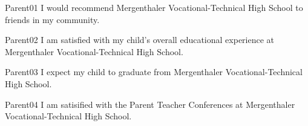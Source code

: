 



\begin{question}{Parent01}
    \QuestionIndicative
    I would recommend Mergenthaler Vocational-Technical High School
        to friends in my community.
    \begin{choiceshoriz}[o]
    \end{choiceshoriz}
\end{question}

\begin{question}{Parent02}
    \QuestionIndicative
    I am satisfied with my child's overall educational experience at
        Mergenthaler Vocational-Technical High School.
    \begin{choiceshoriz}[o]
    \end{choiceshoriz}
\end{question}

\begin{question}{Parent03}
    \QuestionIndicative
    I expect my child to graduate from 
        Mergenthaler Vocational-Technical High School.
    \begin{choiceshoriz}[o]
    \end{choiceshoriz}
\end{question}

\begin{question}{Parent04}
    \QuestionIndicative
    I am satisified with the Parent Teacher Conferences at
        Mergenthaler Vocational-Technical High School.
    \begin{choiceshoriz}[o]
    \end{choiceshoriz}
\end{question}

